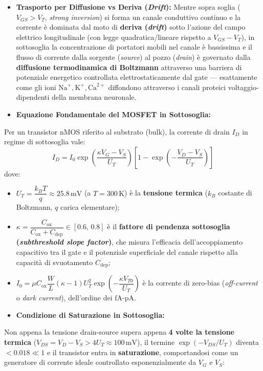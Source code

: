 \documentclass[11pt,a4paper]{article}
\begin{document}
\begin{itemize}
  \item \textbf{Trasporto per Diffusione vs Deriva (\textit{Drift}):} Mentre sopra soglia ($V_{GS} > V_T$, \textit{strong inversion}) si forma un canale conduttivo continuo e la corrente è dominata dal moto di \textbf{deriva (\textit{drift})} sotto l'azione del campo elettrico longitudinale (con legge quadratica/lineare rispetto a $V_{GS} - V_T$), in sottosoglia la concentrazione di portatori mobili nel canale è bassissima e il flusso di corrente dalla sorgente (\textit{source}) al pozzo (\textit{drain}) è governato dalla \textbf{diffusione termodinamica di Boltzmann} attraverso una barriera di potenziale energetico controllata elettrostaticamente dal gate --- esattamente come gli ioni $\text{Na}^+, \text{K}^+, \text{Ca}^{2+}$ diffondono attraverso i canali proteici voltaggio-dipendenti della membrana neuronale.
  \item \textbf{Equazione Fondamentale del MOSFET in Sottosoglia:}
\end{itemize}
Per un transistor nMOS riferito al substrato (bulk), la corrente di drain $I_D$ in regime di sottosoglia vale:
\[
I_D = I_0 \exp\left(\frac{\kappa V_G - V_S}{U_T}\right) \left[ 1 - \exp\left(-\frac{V_D - V_S}{U_T}\right) \right]
\]
dove:
\begin{itemize}
  \item \textbf{$U_T = \dfrac{k_B T}{q} \approx 25.8\,\text{mV}$} (a $T = 300\,\text{K}$) è la \textbf{tensione termica} ($k_B$ costante di Boltzmann, $q$ carica elementare);
  \item \textbf{$\kappa = \dfrac{C_{\text{ox}}}{C_{\text{ox}} + C_{\text{dep}}} \in [0.6,\, 0.8]$} è il \textbf{fattore di pendenza sottosoglia (\textit{subthreshold slope factor})}, che misura l'efficacia dell'accoppiamento capacitivo tra il gate e il potenziale superficiale del canale rispetto alla capacità di svuotamento $C_{\text{dep}}$;
  \item \textbf{$I_0 = \mu C_{\text{ox}} \dfrac{W}{L} (\kappa - 1) U_T^2 \exp\left(-\dfrac{\kappa V_{T0}}{U_T}\right)$} è la corrente di zero-bias (\textit{off-current} o \textit{dark current}), dell'ordine dei $\text{fA}\text{-}\text{pA}$.
  \item \textbf{Condizione di Saturazione in Sottosoglia:}
\end{itemize}
Non appena la tensione drain-source supera appena \textbf{4 volte la tensione termica} ($V_{DS} = V_D - V_S > 4 U_T \approx 100\,\text{mV}$), il termine $\exp(-V_{DS}/U_T)$ diventa $< 0.018 \ll 1$ e il transistor entra in \textbf{saturazione}, comportandosi come un generatore di corrente ideale controllato esponenzialmente da $V_G$ e $V_S$:
\end{document}
